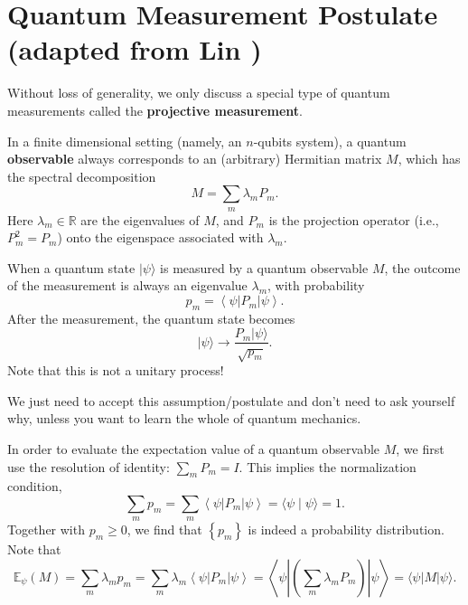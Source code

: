 \documentclass[
        11pt, %
	a4paper, %
]{LegrandOrangeBook}
\begin{document}
\section{Quantum Measurement Postulate (adapted from Lin \cite{lin2022lecture}) }

Without loss of generality, we only discuss a special type of quantum measurements called the \textbf{projective measurement}. 

\begin{theorem}
In a finite dimensional setting (namely, an $n$-qubits system), a quantum \textbf{observable} always corresponds to an (arbitrary) Hermitian matrix $M$, which has the spectral decomposition
\begin{equation}
    M=\sum_m \lambda_m P_m .
\end{equation}
Here $\lambda_m \in \mathbb{R}$ are the eigenvalues of $M$, and $P_m$ is the projection operator (i.e., $P_m^2=P_m$) onto the eigenspace associated with $\lambda_m$.

When a quantum state $|\psi\rangle$ is measured by a quantum observable $M$, the outcome of the measurement is always an eigenvalue $\lambda_m$, with probability
\begin{equation}
    p_m=\left\langle\psi\left|P_m\right| \psi\right\rangle.
\end{equation}
After the measurement, the quantum state becomes
\begin{equation}
    |\psi\rangle \rightarrow \frac{P_m|\psi\rangle}{\sqrt{p_m}}.
\end{equation}
Note that this is not a unitary process!
\end{theorem}

\begin{remark}
    We just need to accept this assumption/postulate and don't need to ask yourself why, unless you want to learn the whole of quantum mechanics.
\end{remark}

In order to evaluate the expectation value of a quantum observable $M$, we first use the resolution of identity: $\sum_m P_m=I$. This implies the normalization condition,
\begin{equation}
    \sum_m p_m=\sum_m\left\langle\psi\left|P_m\right| \psi\right\rangle=\langle\psi \mid \psi\rangle=1.
\end{equation}
Together with $p_m \geq 0$, we find that $\left\{p_m\right\}$ is indeed a probability distribution. Note that
\begin{equation}
    \mathbb{E}_\psi(M)=\sum_m \lambda_m p_m=\sum_m \lambda_m\left\langle\psi\left|P_m\right| \psi\right\rangle=\left\langle\psi\left|\left(\sum_m \lambda_m P_m\right)\right| \psi\right\rangle=\langle\psi|M| \psi\rangle.
\end{equation}
\end{document}
